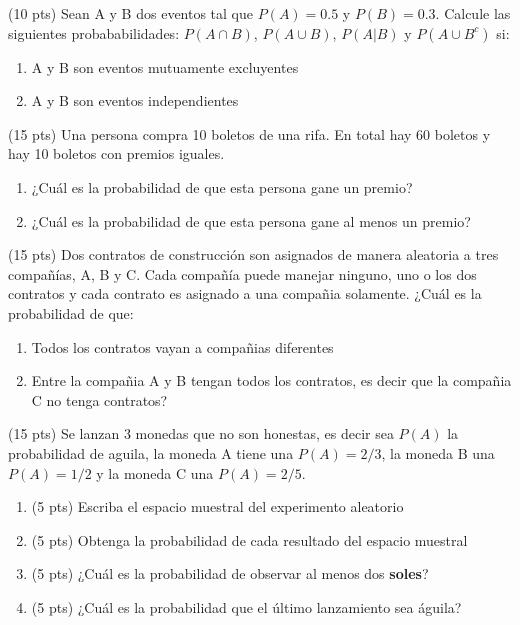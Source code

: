 \documentclass[addpoints]{exam}
\theoremstyle{mytheor}
\begin{document}
  \begin{questions} 

  \question (10 pts)
  Sean A y B dos eventos tal que $P(A) = 0.5$ y $P(B) = 0.3$. Calcule las siguientes probababilidades: $P(A \cap B)$, $P(A \cup B)$, $P(A|B)$ y $P(A \cup B^c)$ si:
  \begin{enumerate}
  \item A y B son eventos mutuamente excluyentes
  \item A y B son eventos independientes
  \end{enumerate}
  
  \question  (15 pts)
  Una persona compra 10 boletos de una rifa. En total hay 60 boletos y hay 10 boletos con premios iguales.
  \begin{enumerate}
  \item ¿Cuál es la probabilidad de que esta persona gane un premio?
  \item ¿Cuál es la probabilidad de que esta persona gane al menos un premio?
  \end{enumerate}
  
  \question (15 pts) Dos contratos de construcción son asignados de manera aleatoria a tres compañías, A, B y C. Cada compañía puede manejar ninguno, uno o los dos contratos y cada contrato es asignado a una compañia solamente. ¿Cuál es la probabilidad de que:
  \begin{enumerate}
  \item Todos los contratos vayan a compañias diferentes
  \item Entre la compañia A y B tengan todos los contratos, es decir que la compañia C no tenga contratos?
  \end{enumerate}


  \question (15 pts) Se lanzan 3 monedas que no son honestas, es decir sea $P(A)$ la probabilidad de aguila, la moneda A tiene una $P(A) = 2/3$, la moneda B una $P(A) = 1/2$ y la moneda C una $P(A) = 2/5$.
  
  \begin{enumerate}
  \item (5 pts) Escriba el espacio muestral del experimento aleatorio
  \item (5 pts) Obtenga la probabilidad de cada resultado del espacio muestral
  \item (5 pts) ¿Cuál es la probabilidad de observar al menos dos \textbf{soles}?
  \item (5 pts) ¿Cuál es la probabilidad que el último lanzamiento sea águila?
  \end{enumerate}
  

\end{questions}
\end{document}
